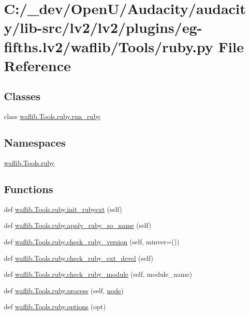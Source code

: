 \hypertarget{lv2_2plugins_2eg-fifths_8lv2_2waflib_2_tools_2ruby_8py}{}\section{C\+:/\+\_\+dev/\+Open\+U/\+Audacity/audacity/lib-\/src/lv2/lv2/plugins/eg-\/fifths.lv2/waflib/\+Tools/ruby.py File Reference}
\label{lv2_2plugins_2eg-fifths_8lv2_2waflib_2_tools_2ruby_8py}
\subsection*{Classes}
\begin{DoxyCompactItemize}
\item 
class \hyperlink{classwaflib_1_1_tools_1_1ruby_1_1run__ruby}{waflib.\+Tools.\+ruby.\+run\+\_\+ruby}
\end{DoxyCompactItemize}
\subsection*{Namespaces}
\begin{DoxyCompactItemize}
\item 
 \hyperlink{namespacewaflib_1_1_tools_1_1ruby}{waflib.\+Tools.\+ruby}
\end{DoxyCompactItemize}
\subsection*{Functions}
\begin{DoxyCompactItemize}
\item 
def \hyperlink{namespacewaflib_1_1_tools_1_1ruby_aefe90baeace8b05bd0038dec33a25d4f}{waflib.\+Tools.\+ruby.\+init\+\_\+rubyext} (self)
\item 
def \hyperlink{namespacewaflib_1_1_tools_1_1ruby_a91ccae4c2fd8fd022d9cf0b408b30ba5}{waflib.\+Tools.\+ruby.\+apply\+\_\+ruby\+\_\+so\+\_\+name} (self)
\item 
def \hyperlink{namespacewaflib_1_1_tools_1_1ruby_a6b1426d0a007a1d029dd549463f35792}{waflib.\+Tools.\+ruby.\+check\+\_\+ruby\+\_\+version} (self, minver=())
\item 
def \hyperlink{namespacewaflib_1_1_tools_1_1ruby_a1152f26b41ce01670cf061540c07642a}{waflib.\+Tools.\+ruby.\+check\+\_\+ruby\+\_\+ext\+\_\+devel} (self)
\item 
def \hyperlink{namespacewaflib_1_1_tools_1_1ruby_a56fd37d84970b70e399a27f937a3c8c6}{waflib.\+Tools.\+ruby.\+check\+\_\+ruby\+\_\+module} (self, module\+\_\+name)
\item 
def \hyperlink{namespacewaflib_1_1_tools_1_1ruby_abc8e4baeca74633f0dc718700b547b88}{waflib.\+Tools.\+ruby.\+process} (self, \hyperlink{structnode}{node})
\item 
def \hyperlink{namespacewaflib_1_1_tools_1_1ruby_a81332d72c1973177fb7f913b94ea205d}{waflib.\+Tools.\+ruby.\+options} (opt)
\end{DoxyCompactItemize}
